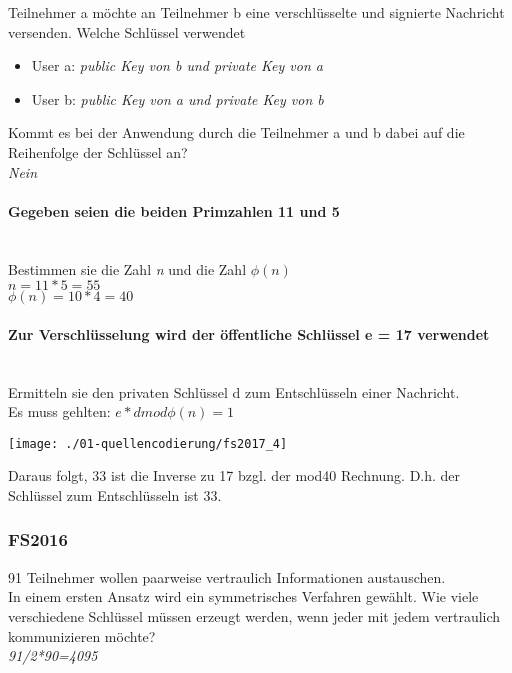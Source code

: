 Teilnehmer a möchte an Teilnehmer b eine verschlüsselte und signierte Nachricht versenden. Welche Schlüssel verwendet
\begin{itemize}
    \item User a: \textit{public Key von b und private Key von a}
    \item User b: \textit{public Key von a und private Key von b}\\
\end{itemize}

Kommt es bei der Anwendung durch die Teilnehmer a und b dabei auf die Reihenfolge der Schlüssel an?\\
\textit{Nein}\\

\paragraph{Gegeben seien die beiden Primzahlen 11 und 5}\mbox{}\\
Bestimmen sie die Zahl \textit{n} und die Zahl $\phi(n)$\\
$n=11*5=55$\\
$\phi(n) = 10*4=40$

\paragraph{Zur Verschlüsselung wird der öffentliche Schlüssel e  = 17 verwendet}\mbox{}\\
Ermitteln sie den privaten Schlüssel d zum Entschlüsseln einer Nachricht.\\
Es muss gehlten: $e*dmod\phi(n)=1$\\

\begin{center}
    \vspace{-8pt}
    \texttt{[image: ./01-quellencodierung/fs2017\_4]}
    \vspace{-8pt}
\end{center}

Daraus folgt, 33 ist die Inverse zu 17 bzgl. der mod40 Rechnung. D.h. der Schlüssel zum Entschlüsseln ist 33.

\subsubsection{FS2016}
91 Teilnehmer wollen paarweise vertraulich Informationen austauschen.\\

In einem ersten Ansatz wird ein symmetrisches Verfahren gewählt. 
Wie viele verschiedene Schlüssel müssen erzeugt werden, wenn jeder mit jedem vertraulich kommunizieren möchte?\\
\textit{91/2*90=4095}\\

